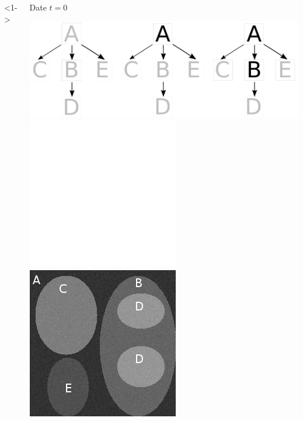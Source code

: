 \begin{frame}
\begin{columns}[c]
			\column{6em}<1->			
				\begin{exampleblock}{Date $t=0$}
					\begin{center}	
						\includegraphics[trim= 0mm 0mm 57mm 0mm, clip, height=0.7\textwidth]{image/contex_gt.pdf}	\vspace{1em}
						\includegraphics[trim= 0mm 0mm 0mm 0mm, clip, height=0.7\textwidth]{image/me_1_3_img_5.png}	\\
						\includegraphics[trim= 0mm 0mm 0mm 0mm, clip, height=0.7\textwidth]{image/me_1_3_img_0.png}						

\end{center}
\end{exampleblock}
\end{columns}
\end{frame}
